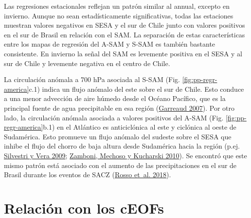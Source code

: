 \documentclass[12pt,oneside,a4paper]{reedthesis}
\begin{document}
Las regresiones estacionales reflejan un patrón similar al annual, excepto en invierno.
Aunque no sean estadísticamente significativas, todas las estaciones muestran valores negativos en SESA y el sur de Chile junto con valores positivos en el sur de Brasil en relación con el SAM.
La separación de estas características entre los mapas de regresión del A-SAM y S-SAM es también bastante consistente.
En invierno la señal del SAM es levemente positiva en el SESA y al sur de Chile y levemente negativa en el centro de Chile.

La circulación anómala a 700 hPa asociada al S-SAM (Fig. \ref{fig:pp-regr-america}c.1) indica un flujo anómalo del este sobre el sur de Chile.
Esto conduce a una menor advección de aire húmedo desde el Océano Pacífico, que es la principal fuente de agua precipitable en esa región (\protect\hyperlink{ref-garreaud2007}{Garreaud 2007}).
Por otro lado, la circulación anómala asociada a valores positivos del A-SAM (Fig. \ref{fig:pp-regr-america}b.1) en el Atlántico es anticiclónica al este y ciclónica al oeste de Sudamérica.
Esto promueve un flujo anómalo del sudeste sobre el SESA que inhibe el flujo del chorro de baja altura desde Sudamérica hacia la región (p.ej. \protect\hyperlink{ref-silvestri2009}{Silvestri y Vera 2009}; \protect\hyperlink{ref-zamboni2010}{Zamboni, Mechoso y Kucharski 2010}).
Se encontró que este mismo patrón está asociado con el aumento de las precipitaciones en el sur de Brasil durante los eventos de SACZ (\protect\hyperlink{ref-rosso2018}{Rosso et~al. 2018}).

\hypertarget{sam-ceof}{%
\section{Relación con los cEOFs}\label{sam-ceof}}
\end{document}
